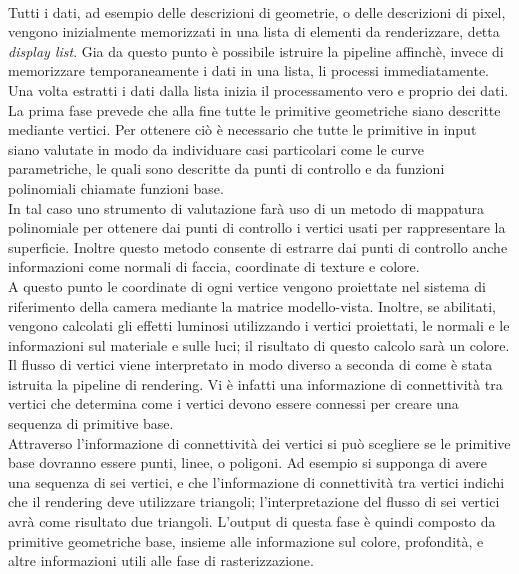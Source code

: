 \\
Tutti i dati, ad esempio delle descrizioni di geometrie, o delle descrizioni di pixel, vengono inizialmente memorizzati in una lista di elementi da renderizzare, detta \emph{display list}. Gia da questo punto è possibile istruire la pipeline affinchè, invece di memorizzare temporaneamente i dati in una lista, li processi immediatamente. 
\\
Una volta estratti i dati dalla lista inizia il processamento vero e proprio dei dati. La prima fase prevede che alla fine tutte le primitive geometriche siano descritte mediante vertici. Per ottenere ciò è necessario che tutte le primitive in input siano valutate in modo da individuare casi particolari come le curve parametriche, le quali sono descritte da punti di controllo e da funzioni polinomiali chiamate funzioni base. 
\\
In tal caso uno strumento di valutazione farà uso di un metodo di mappatura polinomiale per ottenere dai punti di controllo i vertici usati per rappresentare la superficie. Inoltre questo metodo consente di estrarre dai punti di controllo anche informazioni come normali di faccia, coordinate di texture e colore. 
\\
A questo punto le coordinate di ogni vertice vengono proiettate nel sistema di riferimento della camera mediante la matrice modello-vista. Inoltre, se abilitati, vengono calcolati gli effetti luminosi utilizzando i vertici proiettati, le normali  e le informazioni sul materiale e sulle luci; il risultato di questo calcolo sarà un colore.
\\
Il flusso di vertici viene interpretato in modo diverso a seconda di come è stata istruita la pipeline di rendering. Vi è infatti una informazione di connettività tra vertici che determina come i vertici devono essere connessi per creare una sequenza di primitive base. 
\\
Attraverso l’informazione di connettività dei vertici si può scegliere se le primitive base dovranno essere punti, linee, o poligoni. Ad esempio si supponga di avere una sequenza di sei vertici, e che l’informazione di connettività tra vertici indichi che il rendering deve utilizzare triangoli; l’interpretazione del flusso di sei vertici avrà come risultato due triangoli. 
L’output di questa fase è quindi composto da primitive geometriche base, insieme alle informazione sul colore, profondità, e altre informazioni utili alle fase di rasterizzazione.
\\

